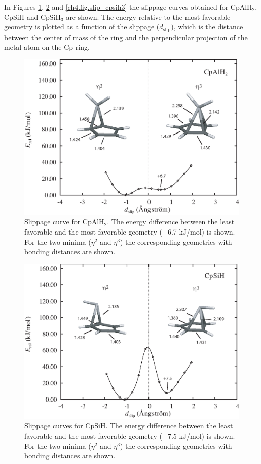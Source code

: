 In Figures \ref{ch4.fig.slip_cpalh2}, \ref{ch4.fig.slip_cpsih} and \ref{ch4.fig.slip_cpsih3} the slippage curves obtained for CpAlH$_2$, CpSiH and CpSiH$_3$ are shown. The energy relative to the most favorable geometry is plotted as a function of  the slippage ($d_\mathrm{slip}$), which is the distance between the center of mass of the ring and the  perpendicular projection of the metal atom on the Cp-ring.
\begin{figure}[hbtp]
\center
\includegraphics[scale=0.80]{cyclopentadienyl/figures/cpalh2.eps}
\caption{Slippage curve for CpAlH$_2$. The energy difference between the least favorable and the most favorable geometry (+6.7 kJ/mol) is shown. For the two minima ($\eta^2$ and $\eta^3$) the corresponding geometries with bonding distances are shown.}
\label{ch4.fig.slip_cpalh2}
\end{figure}
\begin{figure}[htbp]
\center
\includegraphics[scale=0.80]{cyclopentadienyl/figures/cpsih.eps}
\caption{Slippage curves for CpSiH. The energy difference between the least favorable and the most favorable geometry (+7.5 kJ/mol) is shown. For the two minima ($\eta^2$ and $\eta^3$) the corresponding geometries with bonding distances are shown.}
\label{ch4.fig.slip_cpsih}
\end{figure}
